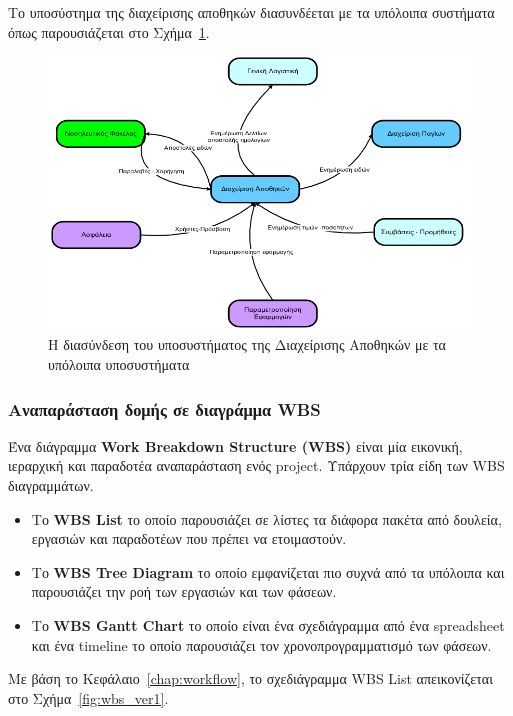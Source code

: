 Το υποσύστημα της διαχείρισης αποθηκών διασυνδέεται με τα υπόλοιπα συστήματα όπως παρουσιάζεται στο Σχήμα~\ref{fig:subsystems}.

\begin{figure}[H]
  \centering
  \includegraphics[width=150mm]{Figures/subsystems.png}
  \caption[Οι σχέσεις της Διαχείρισης Αποθηκών με τα υπόλοιπα υποσυστήματα]{Η διασύνδεση του υποσυστήματος της Διαχείρισης Αποθηκών με τα υπόλοιπα υποσυστήματα}
  \label{fig:subsystems}
\end{figure}

\subsubsection{Αναπαράσταση δομής σε διαγράμμα WBS}

Ένα διάγραμμα \textbf{Work Breakdown Structure (WBS)} είναι μία εικονική, ιεραρχική και παραδοτέα αναπαράσταση ενός project. Υπάρχουν τρία είδη των WBS διαγραμμάτων.

\begin{itemize}
  \item Το \textbf{WBS List} το οποίο παρουσιάζει σε λίστες τα διάφορα πακέτα από δουλεία, εργασιών και παραδοτέων που πρέπει να ετοιμαστούν.
  \item Το \textbf{WBS Tree Diagram} το οποίο εμφανίζεται πιο συχνά από τα υπόλοιπα και παρουσιάζει την ροή των εργασιών και των φάσεων.
  \item Το \textbf{WBS Gantt Chart} το οποίο είναι ένα σχεδιάγραμμα από ένα spreadsheet και ένα timeline το οποίο παρουσιάζει τον χρονοπρογραμματισμό των φάσεων.
\end{itemize}

Με βάση το Κεφάλαιο~\ref{chap:workflow}, το σχεδιάγραμμα WBS List απεικονίζεται στο Σχήμα~\ref{fig:wbs_ver1}.

